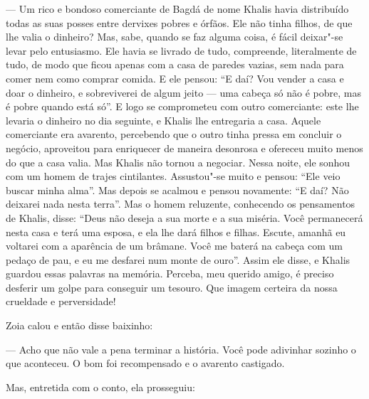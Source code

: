 --- Um rico e bondoso comerciante de Bagdá de nome Khalis havia
distribuído todas as suas posses entre dervixes pobres e órfãos. Ele não
tinha filhos, de que lhe valia o dinheiro? Mas, sabe, quando se faz
alguma coisa, é fácil deixar"-se levar pelo entusiasmo. Ele havia se
livrado de tudo, compreende, literalmente de tudo, de modo que ficou
apenas com a casa de paredes vazias, sem nada para comer nem como
comprar comida. E ele pensou: ``E daí? Vou vender a casa e doar o
dinheiro, e sobreviverei de algum jeito --- uma cabeça só não é pobre,
mas é pobre quando está só''. E logo se comprometeu com outro
comerciante: este lhe levaria o dinheiro no dia seguinte, e Khalis lhe
entregaria a casa. Aquele comerciante era avarento, percebendo que
o outro tinha pressa em concluir o negócio, aproveitou para enriquecer de
maneira desonrosa e ofereceu muito menos do que a casa valia. Mas Khalis
não tornou a negociar. Nessa noite, ele sonhou com um homem de trajes
cintilantes. Assustou"-se muito e pensou: ``Ele veio buscar minha alma''.
Mas depois se acalmou e pensou novamente: ``E daí? Não deixarei nada
nesta terra''. Mas o homem reluzente, conhecendo os pensamentos de
Khalis, disse: ``Deus não deseja a sua morte e a sua miséria. Você
permanecerá nesta casa e terá uma esposa, e ela lhe dará filhos e
filhas. Escute, amanhã eu voltarei com a aparência de um brâmane. Você
me baterá na cabeça com um pedaço de pau, e eu me desfarei num monte de
ouro''. Assim ele disse, e Khalis guardou essas palavras na memória.
Perceba, meu querido amigo, é preciso desferir um golpe para conseguir
um tesouro. Que imagem certeira da nossa crueldade e perversidade! 

Zoia calou e então disse baixinho:

--- Acho que não vale a pena terminar a história. Você pode adivinhar
sozinho o que aconteceu. O bom foi recompensado e o avarento castigado.

Mas, entretida com o conto, ela prosseguiu:

